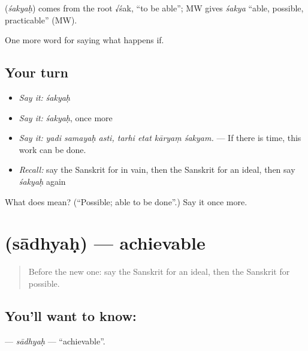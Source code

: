 \begin{cousinweb}
\textbf{} (\emph{śakyaḥ}) comes from the root √śak, \textquotedblleft{}to be able\textquotedblright{}; MW gives \emph{śakya} \textquotedblleft{}able, possible, practicable\textquotedblright{} (MW).
\end{cousinweb}

\begin{grammarlens}[title={What you've built}]
One more word for saying what happens if.
\end{grammarlens}

\subsection*{Your turn}
\begin{itemize}
\raggedright
  \item \emph{Say it:} \emph{śakyaḥ}
  \item \emph{Say it:} \emph{śakyaḥ}, once more
  \item \emph{Say it:} \emph{yadi samayaḥ asti, tarhi etat kāryaṃ śakyam.} — If there is time, this work can be done.
  \item \emph{Recall:} say the Sanskrit for in vain, then the Sanskrit for an ideal, then say \emph{śakyaḥ} again
\end{itemize}

\begin{tcolorbox}[breakable,colback=teal!4,colframe=teal!35!black,title={Before you move on}]
What does  mean? (\textquotedblleft{}Possible; able to be done\textquotedblright{}.) Say it once more.
\end{tcolorbox}
\section[\texorpdfstring{\sk{साध्यः} (sādhyaḥ)}{साध्यः (sādhyaḥ)}]{ (sādhyaḥ) — achievable}

\label{lesson:SA-C389-sadhyah}



\begin{quote}
Before the new one: say the Sanskrit for an ideal, then the Sanskrit for possible.
\end{quote}

\subsection*{You'll want to know: }
\textbf{} — \emph{sādhyaḥ} — \textquotedblleft{}achievable\textquotedblright{}.

